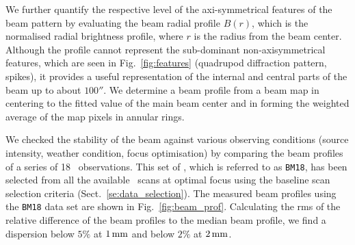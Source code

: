 We further quantify the respective level of the axi-symmetrical
features of the beam pattern by evaluating the beam radial profile
$B(r)$, which is the normalised radial brightness profile,
where $r$ is the radius from the beam center.
Although the profile cannot represent the sub-dominant non-axisymmetrical
features, which are seen in Fig.~\ref{fig:features} (quadrupod
diffraction pattern, spikes), it provides a useful
representation of the internal and central parts of the beam up to
 about $100''$. We determine a beam profile from a beam map in centering to
the fitted value of the main beam center and in forming the
weighted average of the map pixels in annular rings.

We checked the stability of the beam against various
observing conditions (source intensity, weather condition, focus
optimisation) by comparing the beam profiles of a series of 18 \bm\
observations.
This set of \bms, which is referred to as {\tt BM18}, has been
selected from all the available \bm\ scans at optimal focus using the
baseline scan selection criteria (Sect.~\ref{se:data_selection}).
The measured beam profiles using the {\tt BM18} data set are shown in
Fig.~\ref{fig:beam_prof}. Calculating the {\lp rms of the relative}
difference of the beam profiles to the median beam profile, we find a
dispersion below $5\%$ at $1\,\rm{mm}$ and below $2\%$ at
$2\,\rm{mm}$.

